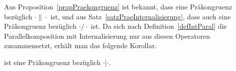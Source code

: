 Aus Proposition~\ref{propPraekongruenz} ist bekannt, dass \ERel{} eine Präkongruenz
bezüglich $\cdot\|\cdot$ ist, und aus Satz~\ref{satzPraeInternalisierung}, dass
\ERel{} auch eine Präkongruenz bezüglich $\cdot/\cdot$ ist. Da sich nach
Definition~\ref{defIntParal} die Parallelkomposition mit Internalisierung nur
aus diesen Operatoren zusammensetzt, erhält man das folgende Korollar.

\begin{kor}
  \ERel{} ist eine Präkongruenz bezüglich $\cdot|\cdot$.
\end{kor}
